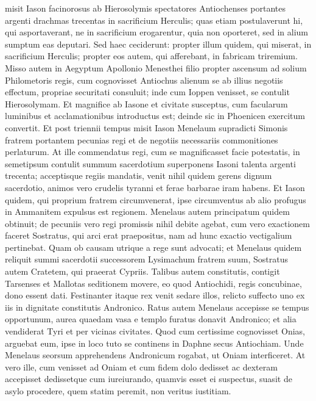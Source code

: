 \begin{biblechapter}
\verse misit Iason facinorosus ab Hierosolymis spectatores Antiochenses portantes argenti drachmas trecentas in sacrificium Herculis; quas etiam postulaverunt hi, qui asportaverant, ne in sacrificium erogarentur, quia non oporteret, sed in alium sumptum eas deputari. 
\verse Sed haec ceciderunt: propter illum quidem, qui miserat, in sacrificium Herculis; propter eos autem, qui afferebant, in fabricam triremium. 
\verse Misso autem in Aegyptum Apollonio Menesthei filio propter ascensum ad solium Philometoris regis, cum cognovisset Antiochus alienum se ab illius negotiis effectum, propriae securitati consuluit; inde cum Ioppen venisset, se contulit Hierosolymam. 
\verse Et magnifice ab Iasone et civitate susceptus, cum facularum luminibus et acclamationibus introductus est; deinde sic in Phoenicen exercitum convertit. 
\verse Et post triennii tempus misit Iason Menelaum supradicti Simonis fratrem portantem pecunias regi et de negotiis necessariis commonitiones perlaturum.  
\verse At ille commendatus regi, cum se magnificasset facie potestatis, in semetipsum contulit summum sacerdotium superponens Iasoni talenta argenti trecenta; 
\verse acceptisque regiis mandatis, venit nihil quidem gerens dignum sacerdotio, animos vero crudelis tyranni et ferae barbarae iram habens. 
\verse Et Iason quidem, qui proprium fratrem circumvenerat, ipse circumventus ab alio profugus in Ammanitem expulsus est regionem. 
\verse Menelaus autem principatum quidem obtinuit; de pecuniis vero regi promissis nihil debite agebat, 
\verse cum vero exactionem faceret Sostratus, qui arci erat praepositus, nam ad hunc exactio vectigalium pertinebat. Quam ob causam utrique a rege sunt advocati;  
\verse et Menelaus quidem reliquit summi sacerdotii successorem Lysimachum fratrem suum, Sostratus autem Cratetem, qui praeerat Cypriis. 
\verse Talibus autem constitutis, contigit Tarsenses et Mallotas seditionem movere, eo quod Antiochidi, regis concubinae, dono essent dati. 
\verse Festinanter itaque rex venit sedare illos, relicto suffecto uno ex iis in dignitate constitutis Andronico. 
\verse Ratus autem Menelaus accepisse se tempus opportunum, aurea quaedam vasa e templo furatus donavit Andronico; et alia vendiderat Tyri et per vicinas civitates. 
\verse Quod cum certissime cognovisset Onias, arguebat eum, ipse in loco tuto se continens in Daphne secus Antiochiam.  
\verse Unde Menelaus seorsum apprehendens Andronicum rogabat, ut Oniam interficeret. At vero ille, cum venisset ad Oniam et cum fidem dolo dedisset ac dexteram accepisset dedissetque cum iureiurando, quamvis esset ei suspectus, suasit de asylo procedere, quem statim peremit, non veritus iustitiam. 

\end{biblechapter}
